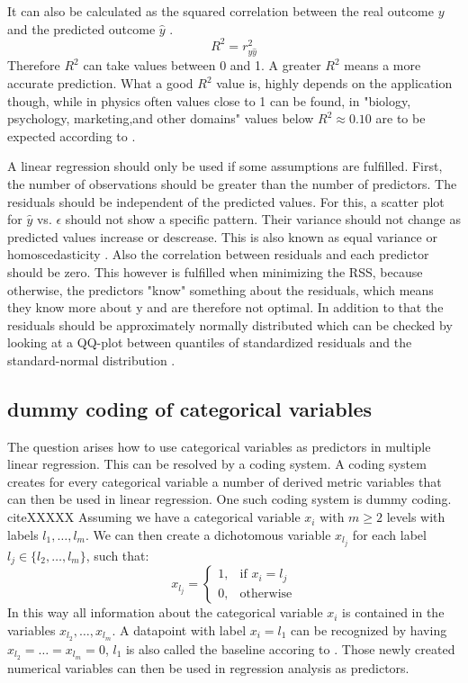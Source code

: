 \documentclass[12 pt]{scrartcl}
\begin{document}
It can also be calculated as the squared correlation between the real outcome $y$ and the predicted outcome $\hat{y}$ \citep[p.~113]{fahrmeir2013regression}.
\[ R^2 =  r_{y\hat{y}}^2\]
Therefore $R^2$ can take values between 0 and 1. A greater $R^2$ means a more accurate prediction. What a good $R^2$ value is, highly depends on the application though, while in physics often values close to 1 can be found, in "biology, psychology, marketing,and other domains" values below $R^2 \approx 0.10$ are to be expected according to \citet[p.~70]{james2013introduction}.

A linear regression should only be used if some assumptions are fulfilled. First, the number of observations should be greater than the number of predictors. The residuals should be independent of the predicted values. For this, a scatter plot for $\hat{y}$ vs. $\epsilon$ should not show a specific pattern. Their variance should not change as predicted values increase or descrease. This is also known as equal variance or homoscedasticity \citep{10Assump62}. Also the correlation between residuals and each predictor should be zero. This however is fulfilled when minimizing the RSS, because otherwise, the predictors "know" something about the residuals, which means they know more about y and are therefore not optimal. In addition to that the residuals should be approximately normally distributed which can be checked by looking at a QQ-plot between quantiles of standardized residuals and the standard-normal distribution \citep{10Assump62}.

\subsection{dummy coding of categorical variables}
The question arises how to use categorical variables as predictors in multiple linear regression. This can be resolved by a coding system. A coding system creates for every categorical variable a number of derived metric variables that can then be used in linear regression. One such coding system is dummy coding. citeXXXXX
Assuming we have a categorical variable $x_i$ with $m \ge 2$ levels with labels $l_1, \dots, l_m$. We can then create a dichotomous variable $x_{l_j}$ for each label $l_j \in\{l_2, \dots, l_m\}$, such that:
\[
  x_{l_j}=
  \begin{cases}
    1, & \text{if } x_i = l_j \\
    0, & \text{otherwise}
  \end{cases}
\]
In this way all information about the categorical variable $x_i$ is contained in the variables $x_{l_2}, \dots, x_{l_m}$. A datapoint with label $x_i = l_1$ can be recognized by having $x_{l_2} = \dots = x_{l_m} = 0$, $l_1$ is also called the baseline accoring to \citet[p.~86]{james2013introduction}. Those newly created numerical variables can then be used in regression analysis as predictors.
\end{document}
